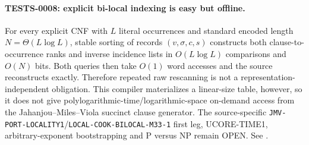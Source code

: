 \paragraph{TESTS-0008: explicit bi-local indexing is easy but offline.}
For every explicit CNF with $L$ literal occurrences and standard encoded
length $N=\Theta(L\log L)$, stable sorting of records
$(v,\sigma,c,s)$ constructs both clause-to-occurrence ranks and inverse
incidence lists in $O(L\log L)$ comparisons and $O(N)$ bits.  Both queries
then take $O(1)$ word accesses and the source reconstructs exactly.
Therefore repeated raw rescanning is not a representation-independent
obligation.  This compiler materializes a linear-size table, however, so it
does not give polylogarithmic-time/logarithmic-space on-demand access from the
Jahanjou--Miles--Viola succinct clause generator.  The source-specific
\texttt{JMV-PORT-LOCALITY1}/\texttt{LOCAL-COOK-BILOCAL-M33-1} first leg,
UCORE-TIME1, arbitrary-exponent bootstrapping and P versus NP remain OPEN.
See
.
